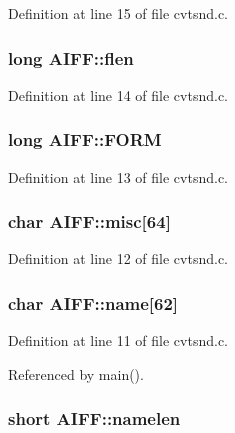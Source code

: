 Definition at line 15 of file cvtsnd.\+c.

\hypertarget{structAIFF_a9f488b6fd2df520b510cf9d4f6fd8a93}{
\subsubsection[{flen}]{\setlength{\rightskip}{0pt plus 5cm}long A\+I\+F\+F\+::flen}}\label{structAIFF_a9f488b6fd2df520b510cf9d4f6fd8a93}


Definition at line 14 of file cvtsnd.\+c.

\hypertarget{structAIFF_a2a365abd76f7768b689bfa9d48f3aea3}{
\subsubsection[{F\+O\+R\+M}]{\setlength{\rightskip}{0pt plus 5cm}long A\+I\+F\+F\+::\+F\+O\+R\+M}}\label{structAIFF_a2a365abd76f7768b689bfa9d48f3aea3}


Definition at line 13 of file cvtsnd.\+c.

\hypertarget{structAIFF_a26bfcc140ed24dceb897818afb302332}{
\subsubsection[{misc}]{\setlength{\rightskip}{0pt plus 5cm}char A\+I\+F\+F\+::misc\mbox{[}64\mbox{]}}}\label{structAIFF_a26bfcc140ed24dceb897818afb302332}


Definition at line 12 of file cvtsnd.\+c.

\hypertarget{structAIFF_a0e5410410479ba3a2ba2f693e9b97953}{
\subsubsection[{name}]{\setlength{\rightskip}{0pt plus 5cm}char A\+I\+F\+F\+::name\mbox{[}62\mbox{]}}}\label{structAIFF_a0e5410410479ba3a2ba2f693e9b97953}


Definition at line 11 of file cvtsnd.\+c.



Referenced by main().

\hypertarget{structAIFF_aab9dbd8c399f4520df88047c706508bd}{
\subsubsection[{namelen}]{\setlength{\rightskip}{0pt plus 5cm}short A\+I\+F\+F\+::namelen}}\label{structAIFF_aab9dbd8c399f4520df88047c706508bd}


